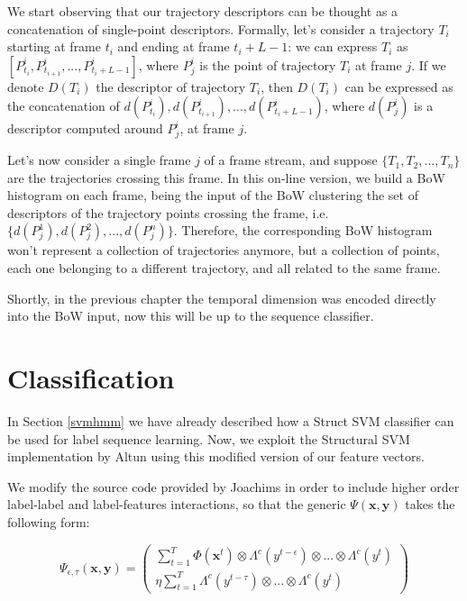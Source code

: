 We start observing that our trajectory descriptors can be thought as a concatenation of single-point descriptors. Formally, let's consider a trajectory $T_i$ starting at frame $t_i$ and ending at frame $t_i+L-1$: we can express $T_i$ as $\left[ P_{t_i}^i, P_{t_{i+1}}^i, ..., P_{t_i+L-1}^i \right]$, where $P_{j}^i$ is the point of trajectory $T_i$ at frame $j$.  If we denote $D(T_i)$ the descriptor of trajectory $T_i$, then $D(T_i)$ can be expressed as the concatenation of $d(P_{t_i}^i), d(P_{t_{i+1}}^i), ..., d( P_{t_i+L-1}^i)$, where $d(P_{j}^i)$ is a descriptor computed around $P_j^i$, at frame $j$. 

Let's now consider a single frame $j$ of a frame stream, and suppose $ \{ T_1, T_2, ..., T_n\}$ are the trajectories crossing this frame. In this on-line version, we build a BoW histogram on each frame, being the input of the BoW clustering the set of descriptors of the trajectory points crossing the frame, i.e. $\{ d(P_{j}^1),  d(P_{j}^2), ...,  d(P_{j}^n) \}$.  Therefore, the corresponding BoW histogram won't represent a collection of trajectories anymore, but a collection of points, each one belonging to a different trajectory, and all related to the same frame.

Shortly, in the previous chapter the temporal dimension was encoded directly into the BoW input, now this will be up to the sequence classifier.


\section{Classification}
 In Section \ref{svmhmm} we have already described how a Struct SVM classifier can be used for label sequence learning. Now, we exploit the Structural SVM implementation by Altun \etal using this modified version of our feature vectors.

 We modify the source code provided by Joachims \cite{joachims} in order to include higher order label-label and label-features interactions, so that the generic 
$\Psi(\mathbf{x},\mathbf{y})$ takes the following form:

\begin{equation}
\Psi_{\epsilon,\tau}(\mathbf{x},\mathbf{y}) = \left( \begin{array}{cc} \sum_{t=1}^T \Phi(\mathbf{x}^t) \otimes  \Lambda^c(y^{t-\epsilon}) \otimes ... \otimes \Lambda^c(y^t) \\ \eta\sum_{t=1}^{T}  \Lambda^c(y^{t-\tau}) \otimes ... \otimes \Lambda^c(y^t) \end{array} \right)
\end{equation}

